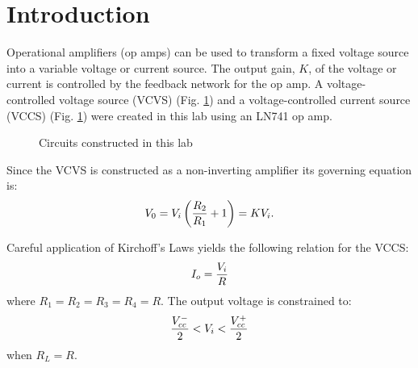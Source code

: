 \section{Introduction}\label{sec:intro}
Operational amplifiers (op amps) can be used to transform a fixed voltage source into a variable voltage or current source.
The output gain, $K$, of the voltage or current is controlled by the feedback network for the op amp.
A voltage-controlled voltage source (VCVS) (Fig. \ref{fig:schematics}) and a voltage-controlled current source (VCCS) (Fig. \ref{fig:schematics}) were created in this lab using an LN741 op amp.
\begin{figure}[htpb!]
	\centering
	\caption{Circuits constructed in this lab \cite[p. 17]{lab-manual}}
	\label{fig:schematics}
\end{figure}

Since the VCVS is constructed as a non-inverting amplifier its governing equation is:
\begin{equation}\label{eq:vcvs}
	V_0 = V_i \left( {R_2 \over R_1} + 1 \right) = K V_i.
\end{equation}

Careful application of Kirchoff's Laws yields the following relation for the VCCS:
\begin{equation*}\label{eq:vccs}
	I_o = {V_i \over R}
\end{equation*}
where $R_1 = R_2 = R_3 = R_4 = R$.
The output voltage is constrained to:
\begin{equation}\label{eq:max-vccs}
	{V_{cc}^- \over 2} < V_i < {V_{cc}^+ \over 2}
\end{equation}
when $R_L = R$.